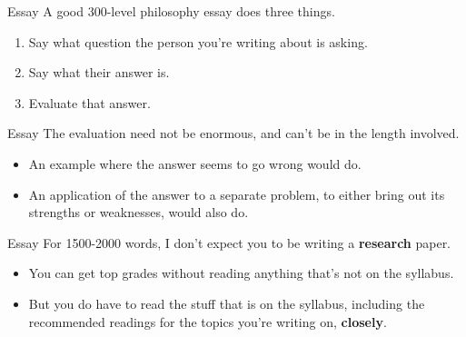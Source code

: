 \documentclass[
  17pt,
  letterpaper,
  ignorenonframetext,
  aspectratio=169,
]{beamer}
\providecommand{\tightlist}{%
  \setlength{\itemsep}{0pt}\setlength{\parskip}{0pt}}\usepackage{longtable,booktabs,array}
\begin{document}
\begin{frame}{Essay}
\protect\hypertarget{essay}{}
A good 300-level philosophy essay does three things.

\begin{enumerate}[<+->]
\tightlist
\item
  Say what question the person you're writing about is asking.
\item
  Say what their answer is.
\item
  Evaluate that answer.
\end{enumerate}
\end{frame}

\begin{frame}{Essay}
\protect\hypertarget{essay-1}{}
The evaluation need not be enormous, and can't be in the length
involved.

\begin{itemize}[<+->]
\tightlist
\item
  An example where the answer seems to go wrong would do.
\item
  An application of the answer to a separate problem, to either bring
  out its strengths or weaknesses, would also do.
\end{itemize}
\end{frame}

\begin{frame}{Essay}
\protect\hypertarget{essay-2}{}
For 1500-2000 words, I don't expect you to be writing a
\textbf{research} paper.

\begin{itemize}[<+->]
\tightlist
\item
  You can get top grades without reading anything that's not on the
  syllabus.
\item
  But you do have to read the stuff that is on the syllabus, including
  the recommended readings for the topics you're writing on,
  \textbf{closely}.
\end{itemize}
\end{frame}
\end{document}
